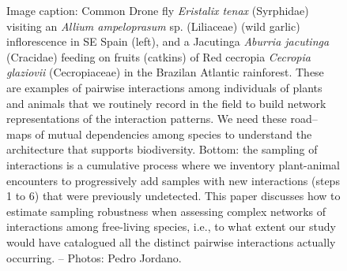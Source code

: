 \documentclass[a4paper,12pt]{article}
\begin{document}
\begin{figure}
  \caption{Image caption: Common Drone fly \textit{Eristalix tenax} (Syrphidae) visiting an \textit{Allium ampeloprasum} sp. (Liliaceae) (wild garlic) inflorescence in SE Spain (left), and a Jacutinga \textit{Aburria jacutinga} (Cracidae) feeding on fruits (catkins) of Red cecropia \textit{Cecropia glaziovii} (Cecropiaceae) in the Brazilan Atlantic rainforest. These are examples of pairwise interactions among individuals of plants and animals that we routinely record in the field to build network representations of the interaction patterns. We need these road--maps of mutual dependencies among species to understand the architecture that supports biodiversity. Bottom: the sampling of interactions is a cumulative process where we inventory plant-animal encounters to progressively add samples with new interactions (steps 1 to 6) that were previously undetected. This paper discusses how to estimate sampling robustness when assessing complex networks of interactions among free-living species, i.e., to what extent our study would have catalogued all the distinct pairwise interactions actually occurring. – Photos: Pedro Jordano.}
  \label{Fig_laysumm}
\end{figure}
\end{document}
